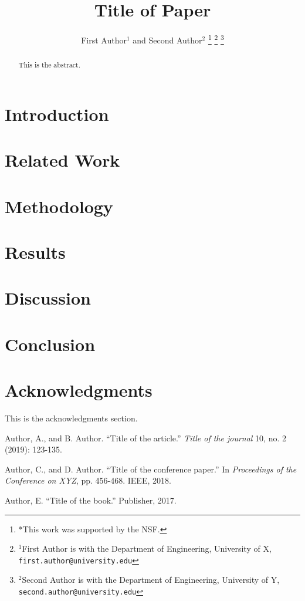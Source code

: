 \documentclass[letterpaper, 10pt, conference]{ieeeconf} %
\title{\LARGE \bf Title of Paper} %
\author{First Author$^{1}$ and Second Author$^{2}$%
    \thanks{*This work was supported by the NSF.}%
    \thanks{$^{1}$First Author is with the Department of Engineering, University of X,
            {\tt\small first.author@university.edu}}%
    \thanks{$^{2}$Second Author is with the Department of Engineering, University of Y,
            {\tt\small second.author@university.edu}}%
}
\begin{document}
    \maketitle
    \thispagestyle{empty}
    \pagestyle{empty}

    \begin{abstract}
        This is the abstract. %
    \end{abstract}

    \section{Introduction}
    \lipsum[1] %

    \section{Related Work}
    \lipsum[2] %

    \section{Methodology}
    \lipsum[3] %

    \section{Results}
    \lipsum[4] %

    \section{Discussion}
    \lipsum[5] %

    \section{Conclusion}
    \lipsum[6] %

    \section*{Acknowledgments}
    This is the acknowledgments section. %

    \begin{thebibliography}{1}

        Author, A., and B. Author. ``Title of the article.'' \textit{Title of the journal} 10, no. 2 (2019): 123-135.

        Author, C., and D. Author. ``Title of the conference paper.'' In \textit{Proceedings of the Conference on XYZ}, pp. 456-468. IEEE, 2018.

        Author, E. ``Title of the book.'' Publisher, 2017.

    \end{thebibliography}
\end{document}
